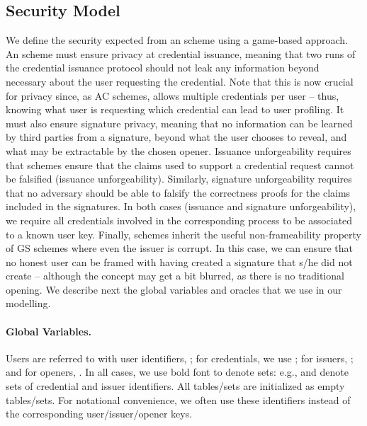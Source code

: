 \subsection{Security Model}
\label{ssec:model-uas}

We define the security expected from an \UAS scheme using a game-based approach.
An \UAS scheme must ensure privacy at credential issuance, meaning that two
runs of the credential issuance protocol should not leak any information beyond
necessary about the user requesting the credential. Note that this is now
crucial for privacy since, as AC schemes, \UAS allows multiple credentials per
user -- thus, knowing what user is requesting which credential can lead to user
profiling. It must also ensure signature privacy, meaning that no information
can be learned by third parties from a signature, beyond what the user chooses
to reveal, and what may be extractable by the chosen opener. Issuance
unforgeability requires that \UAS schemes ensure that the claims used to support
a credential request cannot be falsified (issuance unforgeability). Similarly,
signature unforgeability requires that no adversary should be able to falsify
the correctness proofs for the claims included in the signatures. In both cases
(issuance and signature unforgeability), we require all credentials involved in
the corresponding process to be associated to a known user key. Finally, \UAS
schemes inherit the useful non-frameability property of GS schemes where even
the issuer is corrupt. In this case, we can ensure that no honest user
can be framed with having created a signature that s/he did not create --
although the concept may get a bit blurred, as there is no traditional opening.
%
We describe next the global variables and oracles that we use in our modelling.

\paragraph{Global Variables.} %
Users are referred to with user identifiers, \uid; for credentials, we use \cid;
for issuers, \iid; and for openers, \oid.  In all cases, we use bold font to
denote sets: e.g., \scid and \siid denote sets of credential and issuer
identifiers. All tables/sets are initialized as empty tables/sets. For
notational convenience, we often use these identifiers instead of the
corresponding user/issuer/opener keys.


